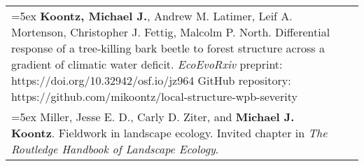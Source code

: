 \begin{longtable}{@{} >{\raggedright}p{5.25in} >{\raggedleft}X @{}}

\hangindent=5ex \textbf{Koontz, Michael J.}, Andrew M. Latimer, Leif A. Mortenson, Christopher J. Fettig, Malcolm P. North. Differential response of a tree-killing bark beetle to forest structure across a gradient of climatic water deficit.
\newline \emph{EcoEvoRxiv} preprint: https://doi.org/10.32942/osf.io/jz964
\newline GitHub repository: https://github.com/mikoontz/local-structure-wpb-severity & 2019 \tabularnewline

\hangindent=5ex Miller, Jesse E. D., Carly D. Ziter, and \textbf{Michael J. Koontz}. Fieldwork in landscape ecology. Invited chapter in \emph{The Routledge Handbook of Landscape Ecology}. & 2019 \tabularnewline

\end{longtable}
